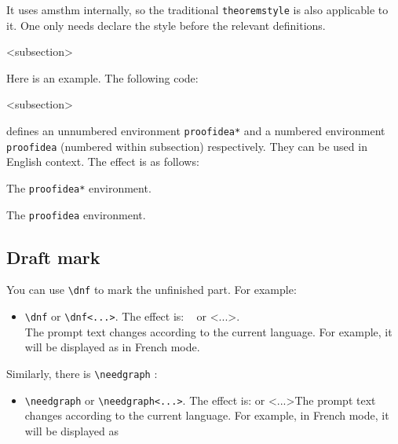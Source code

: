 \documentclass[allowbf]{colorart}
\newenvironment{remind}[1][Remind]{%
    \begin{tcolorbox}[breakable,
        enhanced,
        width = \textwidth,
        colback = white, colbacktitle = paper,
        colframe = gray!50, boxrule=0.2mm,
        coltitle = black,
        fonttitle = \sffamily,
        attach boxed title to top left = {yshift=-\tcboxedtitleheight/2,  xshift=\tcboxedtitlewidth/4},
        boxed title style = {boxrule=0pt, colframe=paper},
        before skip = 0.3cm,
        after skip = 0.3cm,
        top = 3mm,
        bottom = 3mm,
        title={\sffamily #1}]%
}{\end{tcolorbox}}
\begin{document}
\medskip
\begin{remind}
    It uses \textsf{amsthm} internally, so the traditional \texttt{theoremstyle} is also applicable to it. One only needs declare the style before the relevant definitions.
\end{remind}

<subsection>

\bigskip
Here is an example. The following code:
\begin{code}
  <subsection>
\end{code}
defines an unnumbered environment \lstinline|proofidea*| and a numbered environment \lstinline|proofidea| (numbered within subsection) respectively. They can be used in English context. The effect is as follows:

\begin{proofidea*}
    The \lstinline|proofidea*| environment.
\end{proofidea*}

\begin{proofidea}
    The \lstinline|proofidea| environment.
\end{proofidea}

\bigskip
\subsection{Draft mark}

You can use \lstinline|\dnf| to mark the unfinished part. For example:
\begin{itemize}
    \item \lstinline|\dnf| or \lstinline|\dnf<...>|. The effect is: \dnf~ or \dnf<...>. \\The prompt text changes according to the current language. For example, it will be displayed as  in French mode.
\end{itemize}

Similarly, there is \lstinline|\needgraph| : 
\begin{itemize}
    \item \lstinline|\needgraph| or \lstinline|\needgraph<...>|. The effect is: \needgraph or \needgraph<...>The prompt text changes according to the current language. For example, in French mode, it will be displayed as 
\end{itemize}
\end{document}
